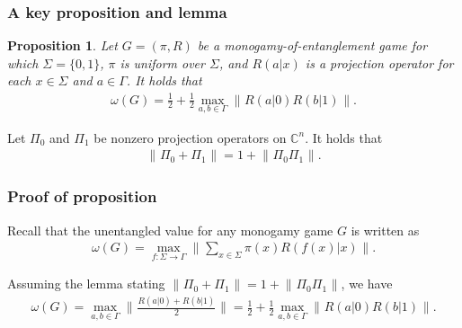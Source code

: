 \documentclass{beamer}
\newcommand{\tinyspace}{\mspace{1mu}}
\newcommand{\norm}[1]{\lVert\tinyspace #1 \tinyspace\rVert}
\newcommand{\biggnorm}[1]{\biggl\lVert\tinyspace #1 \tinyspace\biggr\rVert}
\def\complex{\mathbb{C}}
\newtheorem{prop}[theorem]{Proposition}
\begin{document}
\begin{frame}
	\frametitle{A key proposition and lemma}
	\begin{prop}
		Let $G = (\pi,R)$ be a monogamy-of-entanglement game for which $\Sigma = \{0,1\}$, $\pi$ is uniform over $\Sigma$, and $R(a|x)$ is a projection operator for each $x \in \Sigma$ and $a \in \Gamma$. It holds that 
		\begin{align*}
			\omega(G) = \frac{1}{2} + \frac{1}{2} \max_{a,b \in \Gamma} \biggnorm{R(a|0)R(b|1)}.
		\end{align*}
	\end{prop}
	\vspace{2mm}
	\begin{lemma}
		Let $\Pi_0$ and $\Pi_1$ be nonzero projection operators on $\complex^n$. It holds that 
		\begin{align*}
			\norm{\Pi_0 + \Pi_1} = 1 + \norm{\Pi_0 \Pi_1}.
		\end{align*}
	\end{lemma}
\end{frame}

\begin{frame} 
	\frametitle{Proof of proposition}
	Recall that the unentangled value for any monogamy game $G$ is written as 
	\begin{align*}
		\omega(G) = \max_{f : \Sigma \rightarrow \Gamma} \biggnorm{ \sum_{x \in \Sigma} \pi(x) R(f(x)|x) }.
	\end{align*}			
	\vspace{2mm}
	
	Assuming the lemma stating $\norm{\Pi_0 + \Pi_1} = 1 + \norm{\Pi_0 \Pi_1}$, we have 
	\begin{align*}
		\omega(G) = \max_{a,b \in \Gamma} \biggnorm{ \frac{R(a|0) + R(b|1)}{2} } = \frac{1}{2} + \frac{1}{2} \max_{a,b \in \Gamma} \biggnorm{R(a|0) R(b|1)}.
	\end{align*}
\end{frame}
\end{document}
